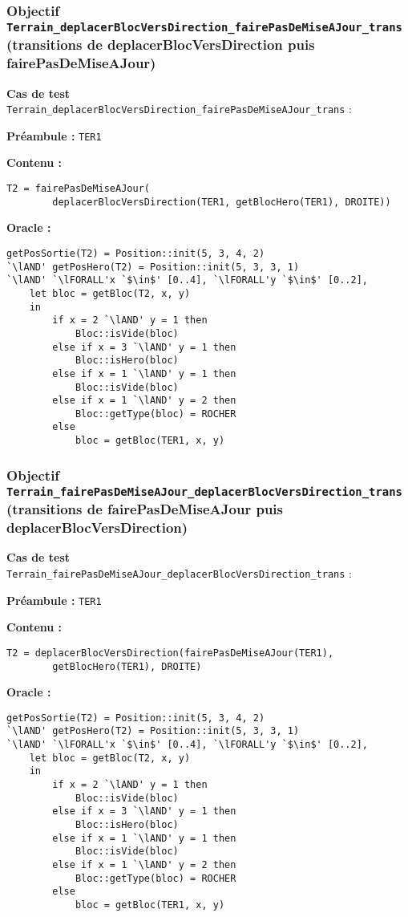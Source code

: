 \documentclass{article}
\newcommand{\cmd}[1]{\texttt{#1}}
\newcommand{\lAND}{$\land$}
\newcommand{\lFORALL}{$\forall$}
\newcommand{\obj}[2]{\subsubsection*{\large{\textbf{Objectif {\cmd{#1} (#2)}}}}}
\newenvironment{cas}[1]
{
	\hspace{1em}\textbf{Cas de test} \cmd{#1} :
	\begin{list}{}{}
}{
	\end{list}\vspace{1em}
}
\newcommand{\pre}[1]{\item \textbf{Préambule :} \cmd{#1}}
\newcommand{\oram}{\item \textbf{Oracle :}}
\newcommand{\opem}{\item \textbf{Contenu :}}
\begin{document}
\obj{Terrain\_deplacerBlocVersDirection\_fairePasDeMiseAJour\_trans\\} {transitions de deplacerBlocVersDirection puis fairePasDeMiseAJour}
	\begin{cas} {Terrain\_deplacerBlocVersDirection\_fairePasDeMiseAJour\_trans}
		\pre{TER1}
		\opem{}
		\begin{lstlisting}
T2 = fairePasDeMiseAJour(
		deplacerBlocVersDirection(TER1, getBlocHero(TER1), DROITE))
		\end{lstlisting}
		\oram{}
		\begin{lstlisting}
getPosSortie(T2) = Position::init(5, 3, 4, 2)
`\lAND' getPosHero(T2) = Position::init(5, 3, 3, 1)
`\lAND' `\lFORALL'x `$\in$' [0..4], `\lFORALL'y `$\in$' [0..2],
	let bloc = getBloc(T2, x, y)
	in
		if x = 2 `\lAND' y = 1 then
			Bloc::isVide(bloc)
		else if x = 3 `\lAND' y = 1 then
			Bloc::isHero(bloc)
		else if x = 1 `\lAND' y = 1 then
			Bloc::isVide(bloc)
		else if x = 1 `\lAND' y = 2 then
			Bloc::getType(bloc) = ROCHER
		else
			bloc = getBloc(TER1, x, y)
		\end{lstlisting}
	\end{cas}

\obj{Terrain\_fairePasDeMiseAJour\_deplacerBlocVersDirection\_trans\\} {transitions de fairePasDeMiseAJour puis deplacerBlocVersDirection}
	\begin{cas} {Terrain\_fairePasDeMiseAJour\_deplacerBlocVersDirection\_trans}
		\pre{TER1}
		\opem{}
		\begin{lstlisting}
T2 = deplacerBlocVersDirection(fairePasDeMiseAJour(TER1),
		getBlocHero(TER1), DROITE)
		\end{lstlisting}
		\oram{}
		\begin{lstlisting}
getPosSortie(T2) = Position::init(5, 3, 4, 2)
`\lAND' getPosHero(T2) = Position::init(5, 3, 3, 1)
`\lAND' `\lFORALL'x `$\in$' [0..4], `\lFORALL'y `$\in$' [0..2],
	let bloc = getBloc(T2, x, y)
	in
		if x = 2 `\lAND' y = 1 then
			Bloc::isVide(bloc)
		else if x = 3 `\lAND' y = 1 then
			Bloc::isHero(bloc)
		else if x = 1 `\lAND' y = 1 then
			Bloc::isVide(bloc)
		else if x = 1 `\lAND' y = 2 then
			Bloc::getType(bloc) = ROCHER
		else
			bloc = getBloc(TER1, x, y)
		\end{lstlisting}
	\end{cas}
\end{document}
